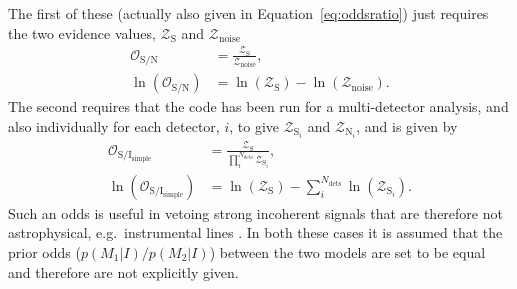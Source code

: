 The first of these (actually also given in Equation~\ref{eq:oddsratio}) just requires the two evidence values, $\mathcal{Z}_{\text{S}}$ and $\mathcal{Z}_{\text{noise}}$
\begin{align}\label{eq:sigvsnoise}
 \mathcal{O}_{\text{S}/\text{N}} &= \frac{\mathcal{Z}_{\text{S}}}{\mathcal{Z}_{\text{noise}}}, \nonumber \\
 \ln{\left(\mathcal{O}_{\text{S}/\text{N}}\right)} &= \ln{\left(\mathcal{Z}_{\text{S}}\right)} - \ln{\left({\mathcal{Z}_{\text{noise}}}\right)}.
\end{align}
The second requires that the code has been run for a multi-detector analysis, and also individually for each detector, $i$, to give $\mathcal{Z}_{\text{S}_i}$
and $\mathcal{Z}_{\text{N}_i}$, and is given by
\begin{align}\label{eq:cohvincoh1}
 \mathcal{O}_{\text{S}/\text{I}_{\text{simple}}} &= \frac{\mathcal{Z}_{\text{S}}}{\prod_i^{N_{\text{dets}}} \mathcal{Z}_{\text{S}_i}}, \nonumber \\
 \ln{\left(\mathcal{O}_{\text{S}/\text{I}_{\text{simple}}}\right)} &= \ln{\left(\mathcal{Z}_{\text{S}}\right)} - \sum_i^{N_{\text{dets}}}\ln{\left(\mathcal{Z}_{\text{S}_i}\right)}.
\end{align}
Such an odds is useful in vetoing strong incoherent signals that are therefore not astrophysical, e.g.\ instrumental lines \citep[see, e.g., the similar
line-robust statistic defined in][]{2014PhRvD..89f4023K}. In both these cases it is assumed
that the prior odds ($p(M_1|I)/p(M_2|I)$) between the two models are set to be equal and therefore are not explicitly given.

